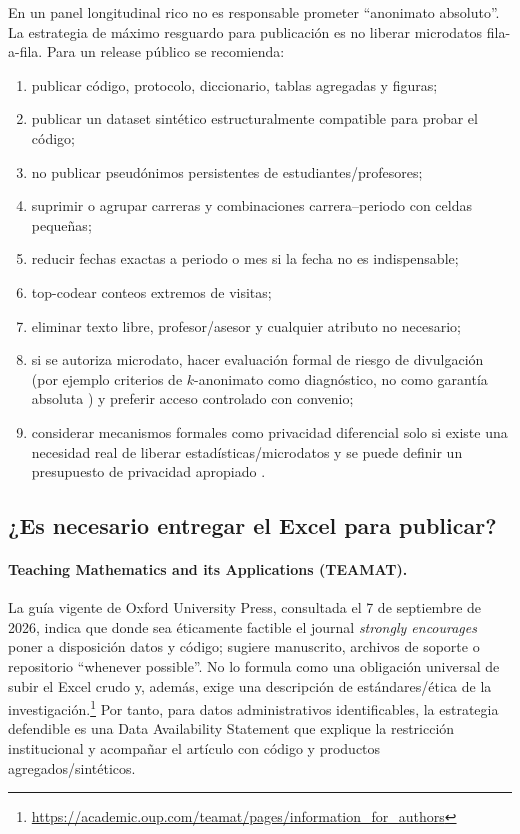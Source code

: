 \documentclass[11pt,letterpaper]{article}
\begin{document}
En un panel longitudinal rico no es responsable prometer ``anonimato absoluto''. La estrategia de máximo resguardo para publicación es no liberar microdatos fila-a-fila. Para un release público se recomienda:
\begin{enumerate}[leftmargin=*]
\item publicar código, protocolo, diccionario, tablas agregadas y figuras;
\item publicar un dataset sintético estructuralmente compatible para probar el código;
\item no publicar pseudónimos persistentes de estudiantes/profesores;
\item suprimir o agrupar carreras y combinaciones carrera--periodo con celdas pequeñas;
\item reducir fechas exactas a periodo o mes si la fecha no es indispensable;
\item top-codear conteos extremos de visitas;
\item eliminar texto libre, profesor/asesor y cualquier atributo no necesario;
\item si se autoriza microdato, hacer evaluación formal de riesgo de divulgación (por ejemplo criterios de $k$-anonimato como diagnóstico, no como garantía absoluta \citep{sweeney2002}) y preferir acceso controlado con convenio;
\item considerar mecanismos formales como privacidad diferencial solo si existe una necesidad real de liberar estadísticas/microdatos y se puede definir un presupuesto de privacidad apropiado \citep{dwork2006}.
\end{enumerate}

\subsection{¿Es necesario entregar el Excel para publicar?}

\paragraph{Teaching Mathematics and its Applications (TEAMAT).} La guía vigente de Oxford University Press, consultada el 7 de septiembre de 2026, indica que donde sea éticamente factible el journal \emph{strongly encourages} poner a disposición datos y código; sugiere manuscrito, archivos de soporte o repositorio ``whenever possible''. No lo formula como una obligación universal de subir el Excel crudo y, además, exige una descripción de estándares/ética de la investigación.\footnote{\url{https://academic.oup.com/teamat/pages/information_for_authors}} Por tanto, para datos administrativos identificables, la estrategia defendible es una Data Availability Statement que explique la restricción institucional y acompañar el artículo con código y productos agregados/sintéticos.
\end{document}
